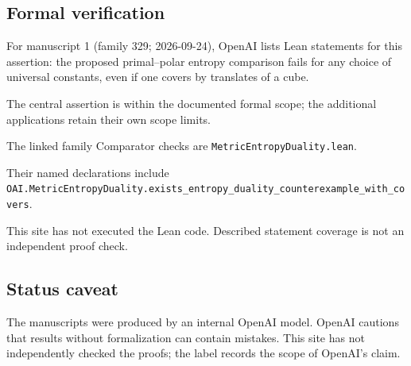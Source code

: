 \documentclass[11pt]{article}
\begin{document}
\subsection{Formal verification}
For manuscript 1 (family 329; 2026-09-24), OpenAI lists Lean statements for this assertion: the proposed primal--polar entropy comparison fails for any choice of universal constants, even if one covers by translates of a cube.

The central assertion is within the documented formal scope; the additional applications retain their own scope limits.

The linked family Comparator checks are \texttt{MetricEntropyDuality.lean}.

Their named declarations include \texttt{OAI.MetricEntropyDuality.exists\_entropy\_duality\_counterexample\_with\_covers}.

This site has not executed the Lean code. Described statement coverage is not an independent proof check.

\subsection{Status caveat}
The manuscripts were produced by an internal OpenAI model. OpenAI cautions that results without formalization can contain mistakes. This site has not independently checked the proofs; the label records the scope of OpenAI's claim.
\end{document}
